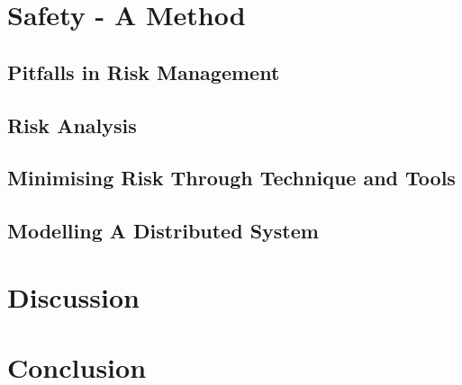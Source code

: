 \section{Safety - A Method}
\subsection{Pitfalls in Risk Management}

\subsection{Risk Analysis}

\subsection{Minimising Risk Through Technique and Tools}

\subsection{Modelling A Distributed System}

\section{Discussion}

\section{Conclusion}
